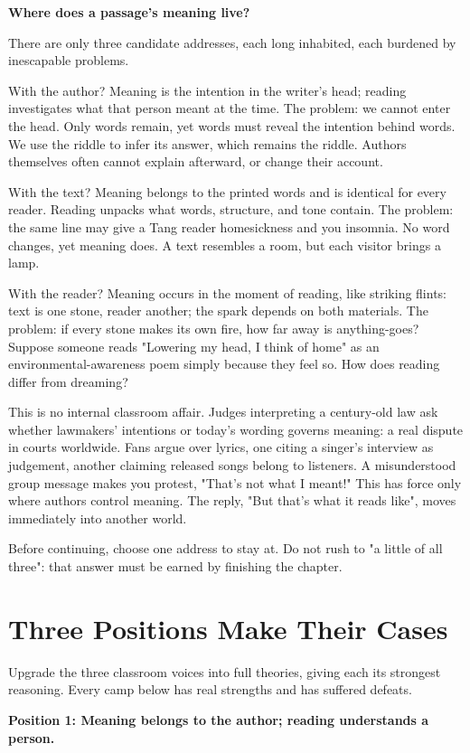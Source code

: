 \textbf{Where does a passage's meaning live?}

There are only three candidate addresses, each long inhabited, each burdened by inescapable problems.

With the author? Meaning is the intention in the writer's head; reading investigates what that person meant at the time. The problem: we cannot enter the head. Only words remain, yet words must reveal the intention behind words. We use the riddle to infer its answer, which remains the riddle. Authors themselves often cannot explain afterward, or change their account.

With the text? Meaning belongs to the printed words and is identical for every reader. Reading unpacks what words, structure, and tone contain. The problem: the same line may give a Tang reader homesickness and you insomnia. No word changes, yet meaning does. A text resembles a room, but each visitor brings a lamp.

With the reader? Meaning occurs in the moment of reading, like striking flints: text is one stone, reader another; the spark depends on both materials. The problem: if every stone makes its own fire, how far away is anything-goes? Suppose someone reads "Lowering my head, I think of home" as an environmental-awareness poem simply because they feel so. How does reading differ from dreaming?

This is no internal classroom affair. Judges interpreting a century-old law ask whether lawmakers' intentions or today's wording governs meaning: a real dispute in courts worldwide. Fans argue over lyrics, one citing a singer's interview as judgement, another claiming released songs belong to listeners. A misunderstood group message makes you protest, "That's not what I meant!" This has force only where authors control meaning. The reply, "But that's what it reads like", moves immediately into another world.

Before continuing, choose one address to stay at. Do not rush to "a little of all three": that answer must be earned by finishing the chapter.

\section{Three Positions Make Their Cases}
Upgrade the three classroom voices into full theories, giving each its strongest reasoning. Every camp below has real strengths and has suffered defeats.

\textbf{Position 1: Meaning belongs to the author; reading understands a person.}

